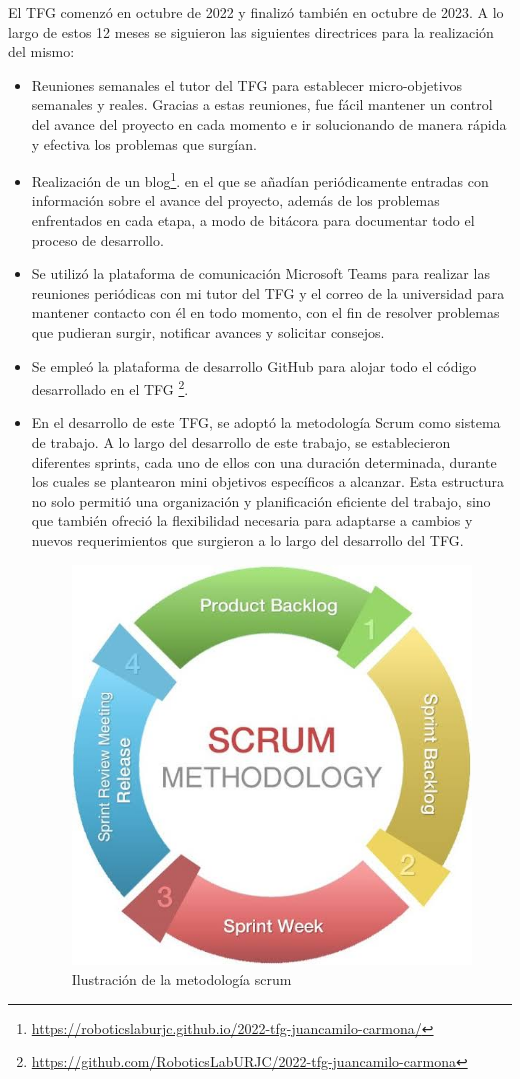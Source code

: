 El \ac{TFG} comenzó en octubre de 2022 y finalizó también en octubre de 2023. A lo largo de estos 12 meses se siguieron las siguientes directrices para la realización del mismo:
\begin{itemize}
	\item Reuniones semanales el tutor del \acs{TFG} para establecer micro-objetivos semanales y reales. Gracias a estas reuniones, fue fácil mantener un control del avance del proyecto en cada momento e ir solucionando de manera rápida y efectiva los problemas que surgían.
	\item Realización de un blog\footnote{\url{https://roboticslaburjc.github.io/2022-tfg-juancamilo-carmona/}}. en el que se añadían periódicamente entradas con información sobre el avance del proyecto, además de los problemas enfrentados en cada etapa, a modo de bitácora para documentar todo el proceso de desarrollo.
	\item Se utilizó la plataforma de comunicación Microsoft Teams para realizar las reuniones periódicas con mi tutor del TFG y el correo de la universidad para mantener contacto con él en todo momento, con el fin de resolver problemas que pudieran surgir, notificar avances y solicitar consejos.
	\item Se empleó la plataforma de desarrollo GitHub para alojar todo el código desarrollado en el \ac{TFG} \footnote{\url{https://github.com/RoboticsLabURJC/2022-tfg-juancamilo-carmona}}.
	\item En el desarrollo de este \ac{TFG}, se adoptó la metodología Scrum como sistema de trabajo. A lo largo del desarrollo de este trabajo, se establecieron diferentes sprints, cada uno de ellos con una duración determinada, durante los cuales se plantearon mini objetivos específicos a alcanzar. Esta estructura no solo permitió una organización y planificación eficiente del trabajo, sino que también ofreció la flexibilidad necesaria para adaptarse a cambios y nuevos requerimientos que surgieron a lo largo del desarrollo del \ac{TFG}.
	
\begin{figure}[h]
	\centering
	\includegraphics[width=0.5\linewidth]{imagenes/cap2/scrum.jpg}
	\caption{Ilustración de la metodología scrum}
	\label{fig:Ilustración de la metodología scrum}
\end{figure}
\end{itemize}

